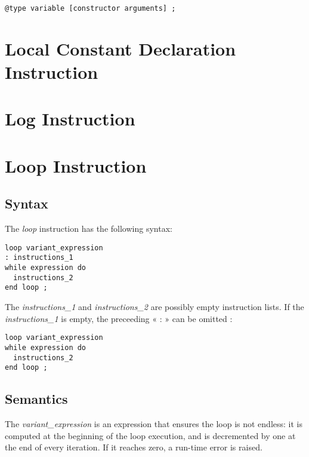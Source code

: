 {
\begin{lstlisting}[language=galgas]
@type variable [constructor arguments] ;
\end{lstlisting}
}


\section{Local Constant Declaration Instruction}




\section{Log Instruction}




\section{Loop Instruction}


\subsection{Syntax}

The \emph{loop} instruction has the following syntax:
{
\begin{lstlisting}[language=galgas]
loop variant_expression
: instructions_1
while expression do
  instructions_2
end loop ;  
\end{lstlisting}
}

The \emph{instructions\_1} and \emph{instructions\_2} are possibly empty instruction lists. If the \emph{instructions\_1} is empty, the preceeding « : » can be omitted :
{
\begin{lstlisting}[language=galgas]
loop variant_expression
while expression do
  instructions_2
end loop ;  
\end{lstlisting}
}

\subsection{Semantics}

The \emph{variant\_expression} is an  expression that ensures the loop is not endless: it is computed at the beginning of the loop execution, and is decremented by one at the end of every iteration. If it reaches zero, a run-time error is raised.

